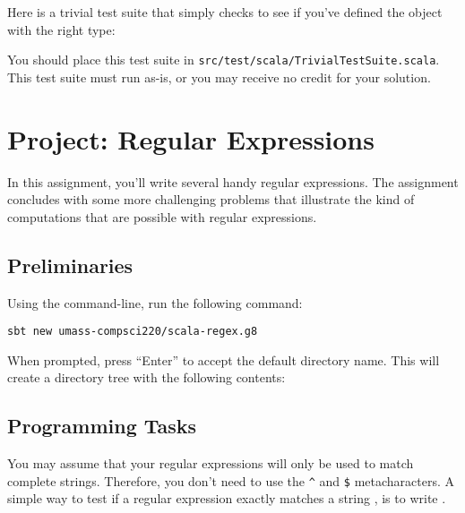 \documentclass[9pt]{extbook}
\begin{document}
Here is a trivial test suite that simply checks to see if you've defined
the  object with the right type:


You should place this test suite in \texttt{src/test/scala/TrivialTestSuite.scala}. This test suite must run as-is, or you may receive no credit for your solution.



\chapter{Project: Regular Expressions}

In this assignment, you'll write several handy regular expressions. The 
assignment concludes with some more challenging problems that illustrate the 
kind of computations that are possible with regular expressions.

\section{Preliminaries}

Using the command-line, run the following command:

\begin{lstlisting}
sbt new umass-compsci220/scala-regex.g8
\end{lstlisting}

When prompted, press ``Enter'' to accept the default directory name. This will
create a directory tree with the following contents:


\section{Programming Tasks}


You may assume that your regular expressions will only be used to match 
complete strings. Therefore, you don't need to use the \texttt{\^} and \texttt{\$} 
metacharacters. A simple way to test if a regular expression  
exactly matches a string , is to write 
.
\end{document}
